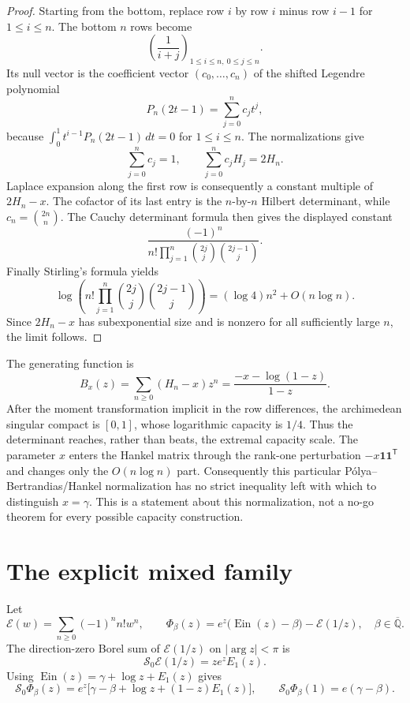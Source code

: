 \documentclass[11pt]{article}
\theoremstyle{definition}
\theoremstyle{remark}
\newcommand{\Qb}{\overline{\mathbb Q}}
\newcommand{\Ein}{\operatorname{Ein}}
\newcommand{\Eul}{\mathcal E}
\begin{document}
\begin{proof}
Starting from the bottom, replace row \(i\) by row \(i\) minus row \(i-1\)
for \(1\le i\le n\).  The bottom \(n\) rows become
\[
 \left(\frac1{i+j}\right)_{1\le i\le n,\ 0\le j\le n}.
\]
Its null vector is the coefficient vector \((c_0,\ldots,c_n)\) of the
shifted Legendre polynomial
\[
 P_n(2t-1)=\sum_{j=0}^nc_jt^j,
\]
because \(\int_0^1t^{i-1}P_n(2t-1)\,dt=0\) for \(1\le i\le n\).
The normalizations give
\[
 \sum_{j=0}^nc_j=1,\qquad
 \sum_{j=0}^nc_jH_j=2H_n.
\]
Laplace expansion along the first row is consequently a constant multiple of
\(2H_n-x\).  The cofactor of its last entry is the \(n\)-by-\(n\) Hilbert
determinant, while \(c_n=\binom{2n}{n}\).  The Cauchy determinant formula
then gives the displayed constant
\[
 \frac{(-1)^n}{n!\prod_{j=1}^n\binom{2j}{j}\binom{2j-1}{j}}.
\]
Finally Stirling's formula yields
\[
 \log\left(n!\prod_{j=1}^n\binom{2j}{j}\binom{2j-1}{j}\right)
 = (\log4)n^2+O(n\log n).
\]
Since \(2H_n-x\) has subexponential size and is nonzero for all sufficiently
large \(n\), the limit follows.
\end{proof}

The generating function is
\begin{equation}\label{eq:harmonic-gen}
 B_x(z)=\sum_{n\ge0}(H_n-x)z^n
 =\frac{-x-\log(1-z)}{1-z}.
\end{equation}
After the moment transformation implicit in the row differences, the
archimedean singular compact is \([0,1]\), whose logarithmic capacity is
\(1/4\).  Thus the determinant reaches, rather than beats, the extremal
capacity scale.  The parameter \(x\) enters the Hankel matrix through the
rank-one perturbation \(-x\mathbf1\mathbf1^{\mathsf T}\) and changes only
the \(O(n\log n)\) part.  Consequently this particular
P\'olya--Bertrandias/Hankel normalization has no strict inequality left with
which to distinguish \(x=\gamma\).  This is a statement about this
normalization, not a no-go theorem for every possible capacity construction.







\section{The explicit mixed family}\label{sec:mixed}

Let
\[
 \Eul(w)=\sum_{n\ge0}(-1)^nn!w^n,
 \qquad
 \Phi_\beta(z)=e^z\bigl(\Ein(z)-\beta\bigr)-\Eul(1/z),
 \quad \beta\in\Qb.
\]
The direction-zero Borel sum of \(\Eul(1/z)\) on \(|\arg z|<\pi\) is
\[
 \mathcal S_0\Eul(1/z)=ze^zE_1(z).
\]
Using \(\Ein(z)=\gamma+\log z+E_1(z)\) gives
\begin{equation}\label{eq:mixed-sum}
 \mathcal S_0\Phi_\beta(z)
 =e^z\bigl[\gamma-\beta+\log z+(1-z)E_1(z)\bigr],
\qquad
 \mathcal S_0\Phi_\beta(1)=e(\gamma-\beta).
\end{equation}
\end{document}
